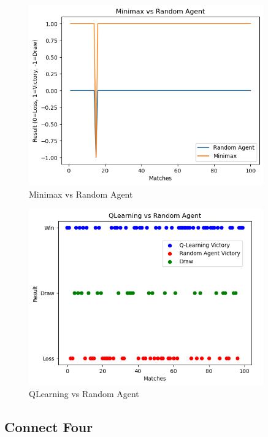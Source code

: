 \documentclass{article}
\begin{document}
\begin{figure}[htbp]
    \centering
    \includegraphics[width=0.9\textwidth]{img 2.png}
    \caption{Minimax vs Random Agent}
    \label{fig:example}
\end{figure}
\begin{figure}[htbp]
    \centering
    \includegraphics[width=0.9\textwidth]{img 3.png}
    \caption{QLearning vs Random Agent}
    \label{fig:example}
\end{figure}


\subsection{Connect Four}
\end{document}
